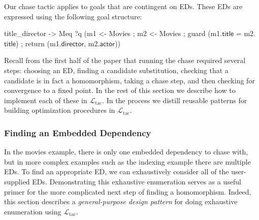 \documentclass{sigplanconf}
\newcommand{\WHERE}{{\tt where}\relax\ifmmode\ \else\xspace\fi}
\newcommand{\ltac}[0]{\ensuremath{\mathcal{L}_{\mathrm{tac}}}}
\begin{document}
Our chase tactic applies to goals that are contingent on EDs.
These EDs are expressed using the following goal structure:
\begin{coq}
title_director ->
Meq ?q
    (m1 <- Movies ; m2 <- Movies ;
     guard (m1.$\textsf{title}$ = m2.$\textsf{title}$) ;
     return (m1.$\textsf{director}$, m2.$\textsf{actor}$))
\end{coq}

Recall from the first half of the paper that running the chase required several steps: choosing an ED, finding a candidate substitution, checking that a candidate is in fact a homomorphism, taking a chase step, and then checking for convergence to a fixed point.
In the rest of this section we describe how to implement each of these in \ltac{}.
In the process we distill reusable patterns for building optimization procedures in \ltac.



\subsubsection{Finding an Embedded Dependency}
\label{sec:traverse-ed}

In the movies example, there is only one embedded dependency to chase with, but in more complex examples such as the indexing example there are multiple EDs.
To find an appropriate ED, we can exhaustively consider all of the user-supplied EDs.
Demonstrating this exhaustive enumeration serves as a useful primer for the more complicated next step of finding a homomorphism.
Indeed, this section describes a \emph{general-purpose design pattern} for doing exhaustive enumeration using \ltac{}.
\end{document}
